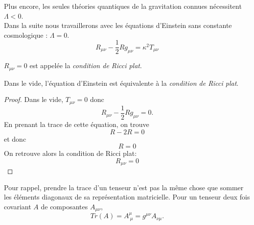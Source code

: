 \documentclass[a4paper,11pt]{report}
\begin{document}
            Plus encore, les seules théories quantiques de la gravitation connues nécessitent $\Lambda<0$.\\
            
            Dans la suite nous travaillerons avec les équations d'Einstein sans constante cosmologique : $\Lambda = 0$.
            \begin{equation}
                R_{\mu\nu}-\frac{1}{2}Rg_{\mu\nu} = \kappa^2 T_{\mu\nu}
            \end{equation}
            
            \begin{definition}
                $R_{\mu\nu} = 0$ est appelée la \textit{condition de Ricci plat}.
            \end{definition}
            
            \begin{prop}\begin{leftbar}
                Dans le vide, l'équation d'Einstein est équivalente à la \textit{condition de Ricci plat}.
            \end{leftbar}\end{prop}
            
            \begin{proof}
                Dans le vide, $T_{\mu\nu}=0$ donc
                \begin{equation}
                    R_{\mu\nu}-\frac{1}{2}Rg_{\mu\nu} = 0.
                \end{equation}
                En prenant la trace de cette équation, on trouve
                \begin{equation}
                    R-2R = 0
                \end{equation}
                et donc
                \begin{equation}
                    R = 0
                \end{equation}
                On retrouve alors la condition de Ricci plat:
                \begin{equation}
                    R_{\mu\nu} = 0
                \end{equation}
            \end{proof}
            Pour rappel, prendre la trace d'un tenseur n'est pas la même chose que sommer les éléments diagonaux de sa représentation matricielle. Pour un tenseur deux fois covariant $A$ de composantes $A_{\mu\nu}$, 
            \begin{equation}
                Tr(A) = A^\mu_{~\mu} = g^{\mu\nu}A_{\nu\mu}.
            \end{equation}
            
\end{document}
